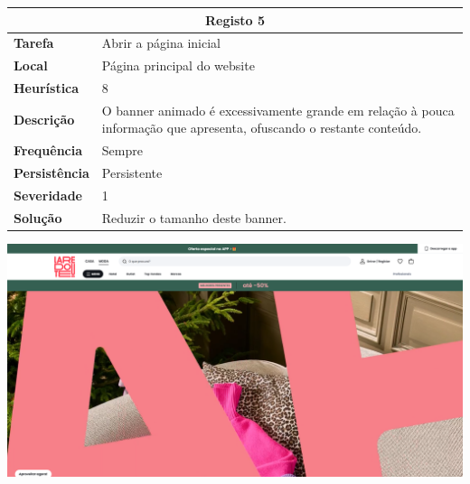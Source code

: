 \documentclass[a4paper,12pt]{article}
\begin{document}
\begin{center}
    \newpage
    \begin{table}[h!]
        \centering
        \begin{tabular}{|m{3cm}|m{12cm}|}
        \hline
        \multicolumn{2}{|c|}{\textbf{Registo 5}} \\ \hline
        \textbf{Tarefa}       & Abrir a página inicial \\ \hline
        \textbf{Local}        & Página principal do website \\ \hline
        \textbf{Heurística}   & 8  \\ \hline
        \textbf{Descrição}    & O banner animado é excessivamente grande em relação à pouca informação que apresenta, ofuscando o restante conteúdo. \\ \hline
        \textbf{Frequência}   & Sempre \\ \hline
        \textbf{Persistência} & Persistente \\ \hline
        \textbf{Severidade}   & 1 \\ \hline
        \textbf{Solução}      &Reduzir o tamanho deste banner. \\ \hline
        \end{tabular}
    \end{table}
    
    \vspace{0.5cm}
    \includegraphics[width=\textwidth, keepaspectratio]{heuristics/05informacao_homepage.png}


\end{center}
\end{document}
